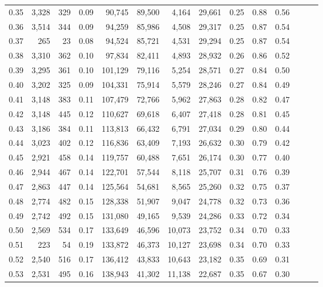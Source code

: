 \begin{tabular}{rrrrrrrrrrrrrr}
0.35 &  3,328 &  329 &  0.09 &   90,745 &   89,500 &   4,164 &  29,661 &  0.25 &  0.88 &      0.56 \\
0.36 &  3,514 &  344 &  0.09 &   94,259 &   85,986 &   4,508 &  29,317 &  0.25 &  0.87 &      0.54 \\
0.37 &    265 &   23 &  0.08 &   94,524 &   85,721 &   4,531 &  29,294 &  0.25 &  0.87 &      0.54 \\
0.38 &  3,310 &  362 &  0.10 &   97,834 &   82,411 &   4,893 &  28,932 &  0.26 &  0.86 &      0.52 \\
0.39 &  3,295 &  361 &  0.10 &  101,129 &   79,116 &   5,254 &  28,571 &  0.27 &  0.84 &      0.50 \\
0.40 &  3,202 &  325 &  0.09 &  104,331 &   75,914 &   5,579 &  28,246 &  0.27 &  0.84 &      0.49 \\
0.41 &  3,148 &  383 &  0.11 &  107,479 &   72,766 &   5,962 &  27,863 &  0.28 &  0.82 &      0.47 \\
0.42 &  3,148 &  445 &  0.12 &  110,627 &   69,618 &   6,407 &  27,418 &  0.28 &  0.81 &      0.45 \\
0.43 &  3,186 &  384 &  0.11 &  113,813 &   66,432 &   6,791 &  27,034 &  0.29 &  0.80 &      0.44 \\
0.44 &  3,023 &  402 &  0.12 &  116,836 &   63,409 &   7,193 &  26,632 &  0.30 &  0.79 &      0.42 \\
0.45 &  2,921 &  458 &  0.14 &  119,757 &   60,488 &   7,651 &  26,174 &  0.30 &  0.77 &      0.40 \\
0.46 &  2,944 &  467 &  0.14 &  122,701 &   57,544 &   8,118 &  25,707 &  0.31 &  0.76 &      0.39 \\
0.47 &  2,863 &  447 &  0.14 &  125,564 &   54,681 &   8,565 &  25,260 &  0.32 &  0.75 &      0.37 \\
0.48 &  2,774 &  482 &  0.15 &  128,338 &   51,907 &   9,047 &  24,778 &  0.32 &  0.73 &      0.36 \\
0.49 &  2,742 &  492 &  0.15 &  131,080 &   49,165 &   9,539 &  24,286 &  0.33 &  0.72 &      0.34 \\
0.50 &  2,569 &  534 &  0.17 &  133,649 &   46,596 &  10,073 &  23,752 &  0.34 &  0.70 &      0.33 \\
0.51 &    223 &   54 &  0.19 &  133,872 &   46,373 &  10,127 &  23,698 &  0.34 &  0.70 &      0.33 \\
0.52 &  2,540 &  516 &  0.17 &  136,412 &   43,833 &  10,643 &  23,182 &  0.35 &  0.69 &      0.31 \\
0.53 &  2,531 &  495 &  0.16 &  138,943 &   41,302 &  11,138 &  22,687 &  0.35 &  0.67 &      0.30 \\

\end{tabular}
